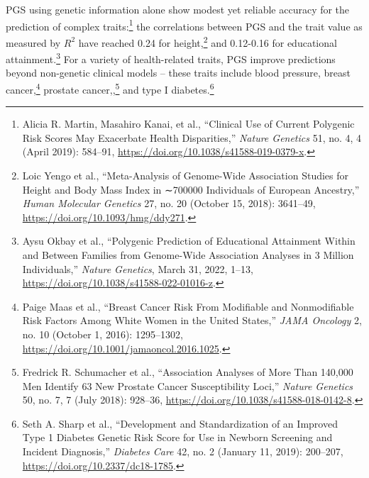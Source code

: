 \documentclass[
]{book}
\begin{document}
PGS using genetic information alone show modest yet reliable accuracy for the prediction of complex traits:\footnote{Alicia R. Martin, Masahiro Kanai, et al., {``Clinical Use of Current Polygenic Risk Scores May Exacerbate Health Disparities,''} \emph{Nature Genetics} 51, no. 4, 4 (April 2019): 584--91, \url{https://doi.org/10.1038/s41588-019-0379-x}.} the correlations between PGS and the trait value as measured by \(R^2\) have reached 0.24 for height,\footnote{Loic Yengo et al., {``Meta-Analysis of Genome-Wide Association Studies for Height and Body Mass Index in ∼700000 Individuals of {European} Ancestry,''} \emph{Human Molecular Genetics} 27, no. 20 (October 15, 2018): 3641--49, \url{https://doi.org/10.1093/hmg/ddy271}.} and 0.12-0.16 for educational attainment.\footnote{Aysu Okbay et al., {``Polygenic Prediction of Educational Attainment Within and Between Families from Genome-Wide Association Analyses in 3 Million Individuals,''} \emph{Nature Genetics}, March 31, 2022, 1--13, \url{https://doi.org/10.1038/s41588-022-01016-z}.} For a variety of health-related traits, PGS improve predictions beyond non-genetic clinical models -- these traits include blood pressure, breast cancer,\footnote{Paige Maas et al., {``Breast {Cancer Risk From Modifiable} and {Nonmodifiable Risk Factors Among White Women} in the {United States},''} \emph{JAMA Oncology} 2, no. 10 (October 1, 2016): 1295--1302, \url{https://doi.org/10.1001/jamaoncol.2016.1025}.} prostate cancer,,\footnote{Fredrick R. Schumacher et al., {``Association Analyses of More Than 140,000 Men Identify 63 New Prostate Cancer Susceptibility Loci,''} \emph{Nature Genetics} 50, no. 7, 7 (July 2018): 928--36, \url{https://doi.org/10.1038/s41588-018-0142-8}.} and type I diabetes.\footnote{Seth A. Sharp et al., {``Development and {Standardization} of an {Improved Type} 1 {Diabetes Genetic Risk Score} for {Use} in {Newborn Screening} and {Incident Diagnosis},''} \emph{Diabetes Care} 42, no. 2 (January 11, 2019): 200--207, \url{https://doi.org/10.2337/dc18-1785}.}
\end{document}
